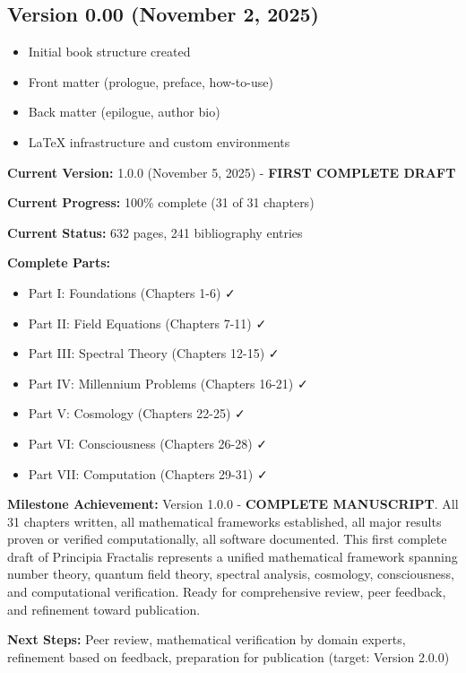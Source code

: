 \subsection*{Version 0.00 (November 2, 2025)}
\begin{itemize}
\item Initial book structure created
\item Front matter (prologue, preface, how-to-use)
\item Back matter (epilogue, author bio)
\item LaTeX infrastructure and custom environments
\end{itemize}

\vspace{2cm}

\noindent\textbf{Current Version:} 1.0.0 (November 5, 2025) - \textbf{FIRST COMPLETE DRAFT}

\noindent\textbf{Current Progress:} 100\% complete (31 of 31 chapters)

\noindent\textbf{Current Status:} 632 pages, 241 bibliography entries

\noindent\textbf{Complete Parts:}
\begin{itemize}
\item Part I: Foundations (Chapters 1-6) ✓
\item Part II: Field Equations (Chapters 7-11) ✓
\item Part III: Spectral Theory (Chapters 12-15) ✓
\item Part IV: Millennium Problems (Chapters 16-21) ✓
\item Part V: Cosmology (Chapters 22-25) ✓
\item Part VI: Consciousness (Chapters 26-28) ✓
\item Part VII: Computation (Chapters 29-31) ✓
\end{itemize}

\noindent\textbf{Milestone Achievement:} Version 1.0.0 - \textbf{COMPLETE MANUSCRIPT}. All 31 chapters written, all mathematical frameworks established, all major results proven or verified computationally, all software documented. This first complete draft of Principia Fractalis represents a unified mathematical framework spanning number theory, quantum field theory, spectral analysis, cosmology, consciousness, and computational verification. Ready for comprehensive review, peer feedback, and refinement toward publication.

\noindent\textbf{Next Steps:} Peer review, mathematical verification by domain experts, refinement based on feedback, preparation for publication (target: Version 2.0.0)
